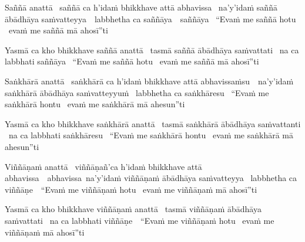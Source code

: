 \begin{pali-hang}
  Saññā anattā \breathmark\ saññā ca h'idaṁ bhikkhave attā abhavissa \breathmark\ na'y'idaṁ saññā ābādhāya \mbox{saṁvatteyya}~\breathmark\ labbhetha ca \ifbfive \mbox{saññāya}~\breathmark\ \else saññāya \breathmark\ \fi ``Evaṁ me saññā hotu \breathmark\ evaṁ me saññā mā ahosī''ti
\end{pali-hang}
\begin{pali-hang-together}
  Yasmā ca kho bhikkhave saññā anattā \breathmark\ tasmā saññā ābādhāya saṁvattati \breathmark\ na ca labbhati saññāya \breathmark\ ``Evaṁ me saññā hotu \breathmark\ evaṁ me saññā mā ahosī''ti
\end{pali-hang-together}

\ifafive\clearpage\fi

\begin{pali-hang}
  Saṅkhārā anattā \breathmark\ saṅkhārā ca h'idaṁ bhikkhave attā \mbox{abhavissaṁsu}~\breathmark\ na'y'idaṁ saṅkhārā ābādhāya saṁvatteyyuṁ \breathmark\ labbhetha ca saṅkhāresu \breathmark\ ``Evaṁ me saṅkhārā hontu \breathmark\ evaṁ me saṅkhārā mā ahesun''ti
\end{pali-hang}
\begin{pali-hang-together}
  Yasmā ca kho bhikkhave saṅkhārā anattā \breathmark\ tasmā saṅkhārā ābādhāya saṁvattanti \breathmark\ na ca labbhati saṅkhāresu \breathmark\ ``Evaṁ me saṅkhārā hontu \breathmark\ evaṁ me saṅkhārā mā ahesun''ti
\end{pali-hang-together}

\begin{pali-hang}
  Viññāṇaṁ anattā \breathmark\ viññāṇañ'ca h'idaṁ bhikkhave attā \ifbfive \mbox{abhavissa}~\breathmark\ \else abhavissa\breathmark\ \fi na'y'idaṁ viññāṇaṁ ābādhāya saṁvatteyya \breathmark\ labbhetha ca \mbox{viññāṇe}~\breathmark\ ``Evaṁ me viññāṇaṁ hotu \breathmark\ evaṁ me viññāṇaṁ mā ahosī''ti
\end{pali-hang}
\begin{pali-hang-together}
  Yasmā ca kho bhikkhave viññāṇaṁ anattā \breathmark\ tasmā viññāṇaṁ ābādhāya saṁvattati \breathmark\ na ca labbhati \mbox{viññāṇe}~\breathmark\ ``Evaṁ me viññāṇaṁ hotu \breathmark\ evaṁ me viññāṇaṁ mā ahosī''ti
\end{pali-hang-together}

